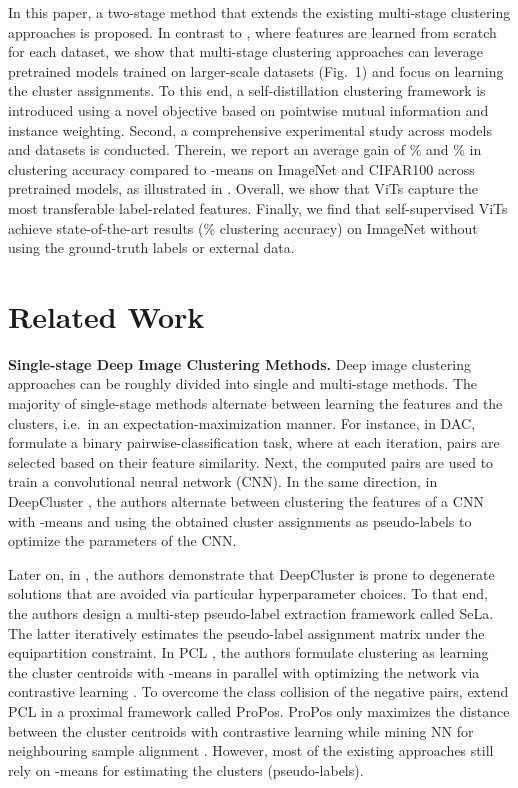 \documentclass{bmvc2k}
\begin{document}
In this paper, a two-stage method that extends the existing multi-stage clustering approaches is proposed. In contrast to \cite{scan}, where features are learned from scratch for each dataset, we show that multi-stage clustering approaches can leverage pretrained models trained on larger-scale datasets (Fig.\ 1) and focus on learning the cluster assignments. To this end, a self-distillation clustering framework is introduced using a novel objective based on pointwise mutual information and instance weighting. Second, a comprehensive experimental study across models and datasets is conducted. Therein, we report an average gain of \% and \% in clustering accuracy compared to -means on ImageNet and CIFAR100 across  pretrained models, as illustrated in . Overall, we show that ViTs capture the most transferable label-related features. Finally, we find that self-supervised ViTs \cite{msn} achieve state-of-the-art results (\% clustering accuracy) on ImageNet without using the ground-truth labels or external data.


\section{Related Work}
\label{related}
\noindent\textbf{Single-stage Deep Image Clustering Methods.} Deep image clustering approaches can be roughly divided into single and multi-stage methods. The majority of single-stage methods alternate between learning the features and the clusters, i.e.\ in an expectation-maximization manner. For instance, in DAC, \cite{chang2017deep} formulate a binary pairwise-classification task, where at each iteration, pairs are selected based on their feature similarity. Next, the computed pairs are used to train a convolutional neural network (CNN). In the same direction, in DeepCluster \cite{deepcluster}, the authors alternate between clustering the features of a CNN with -means \cite{lloyd1982kmeans} and using the obtained cluster assignments as pseudo-labels to optimize the parameters of the CNN. 

Later on, in \cite{sela}, the authors demonstrate that DeepCluster is prone to degenerate solutions that are avoided via particular hyperparameter choices. To that end, the authors design a multi-step pseudo-label extraction framework called SeLa. The latter iteratively estimates the pseudo-label assignment matrix under the equipartition constraint. In PCL \cite{pcl}, the authors formulate clustering as learning the cluster centroids with -means in parallel with optimizing the network via contrastive learning \cite{simclr}. To overcome the class collision of the negative pairs, \cite{propos} extend PCL in a proximal framework called ProPos. ProPos only maximizes the distance between the cluster centroids with contrastive learning while mining NN for neighbouring sample alignment \cite{byol}. However, most of the existing approaches still rely on -means for estimating the clusters (pseudo-labels).
\end{document}
